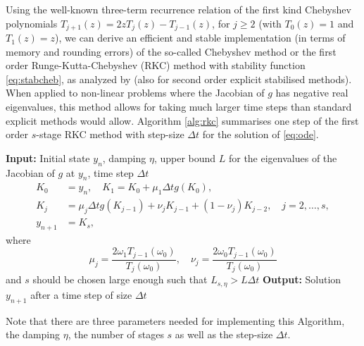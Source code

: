 \documentclass[10pt,a4paper]{article}
\begin{document}
        Using the well-known three-term recurrence relation of the first kind Chebyshev polynomials $T_{j+1}(z)=2zT_j(z)-T_{j-1}(z)$, for $j\geq2$ (with $T_0(z)=1$ and $T_1(z)=z$), we can derive an efficient and stable implementation (in terms of memory and rounding errors) of the so-called Chebyshev method or the first order Runge-Kutta-Chebyshev (RKC) method with stability function \eqref{eq:stabcheb},  as analyzed by \cite{vanderHouwen1980} (also for second order explicit stabilised methods). When applied to non-linear problems where the Jacobian of $g$ has negative real eigenvalues, this method allows for taking much larger time steps than standard explicit methods would allow. Algorithm \ref{alg:rkc} summarises one step of the first order $s$-stage RKC method with step-size $\Delta t$ for the solution of \eqref{eq:ode}. 
\begin{algorithm}  
\caption{{First order} Runge-Kutta Chebyshev for the time integration of \eqref{eq:ode}} 
\textbf{Input:} Initial state $y_{n}$, damping $\eta$, upper bound $L$ for the eigenvalues of  the Jacobian of $g$ at $y_{n}$, time step $\Delta t$
        \begin{equation}\label{eq:rkc1}
            \begin{split}
            K_0 &= y_n,\quad K_1=K_0+\mu_1 \Delta t g(K_0),\\
            K_j &= \mu_j \Delta t g(K_{j-1})+\nu_jK_{j-1}+(1-\nu_j)K_{j-2},\quad j=2,\dots,s,\\
            y_{n+1} &= K_s,
            \end{split}
        \end{equation}
        where
        $$\mu_j=\frac{2\omega_1T_{j-1}(\omega_0)}{T_j(\omega_0)},\quad \nu_j=\frac{2\omega_0T_{j-1}(\omega_0)}{T_j(\omega_0)}$$
        and $s$ should be chosen large enough such that $L_{s,\eta}>L\Delta t$ 
        \newline
        \textbf{Output:} Solution $y_{n+1}$ after a time step of size $\Delta t$ 
        \label{alg:rkc}
\end{algorithm}
Note that there are three parameters needed for implementing this Algorithm, the damping $\eta$, the number of stages $s$ as well as the  step-size $\Delta t$. 
\end{document}
